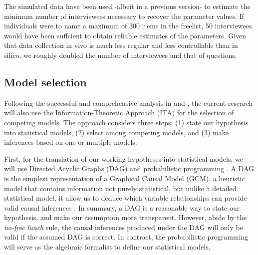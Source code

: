 The simulated data have been used -albeit in a previous version- to estimate the minimum number of interviewees necessary to recover the parameter values. If individuals were to name a maximum of 300 items in the freelist, 50 interviewees would have been suffcient to obtain reliable estimates of the parameters. Given that data collection in vivo is much less regular and less controllable than in silico, we roughly doubled the number of interviewees and that of questions.


\subsection{Model selection}
%
Following the successful and comprehensive analysis in \citet{vanDaal_2020} and \citet{Lesterhuis_2018}, the current research will also use the Information-Theoretic Approach (ITA) \citep{Anderson_2008, Chamberlain_1965} for the selection of competing models. The approach considers three steps: (1) state our hypothesis into statistical models, (2) select among competing models, and (3) make inferences based on one or multiple models.

First, for the translation of our working hypotheses into statistical models, we will use Directed Acyclic Graphs (DAG) and probabilistic programming \citep{Jaynes_2003}. A DAG is the simplest representation of a Graphical Causal Model (GCM), a heuristic model that contains information not purely statistical, but unlike a detailed statistical model, it allow us to deduce which variable relationships can provide valid causal inferences \citep{Hernan_et_al_2020, McElreath_2020}. In summary, a DAG is a reasonable way to state our hypothesis, and make our assumption more transparent. However, abide by the \textit{no-free lunch} rule, the causal inferences produced under the DAG will only be valid if the assumed DAG is correct. In contrast, the probabilistic programming will serve as the algebraic formalist to define our statistical models.

